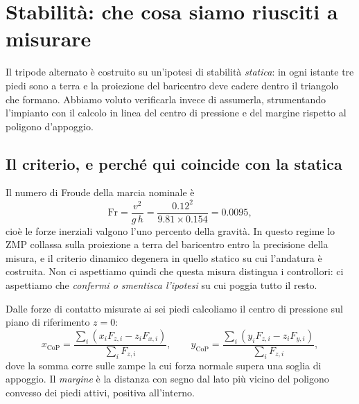 
\section{Stabilità: che cosa siamo riusciti a misurare}
\label{sec:zmp}

Il tripode alternato è costruito su un'ipotesi di stabilità \emph{statica}:
in ogni istante tre piedi sono a terra e la proiezione del baricentro deve
cadere dentro il triangolo che formano. Abbiamo voluto verificarla invece di
assumerla, strumentando l'impianto con il calcolo in linea del centro di
pressione e del margine rispetto al poligono d'appoggio.

\subsection{Il criterio, e perché qui coincide con la statica}

Il numero di Froude della marcia nominale è
\begin{equation}
\mathrm{Fr} = \frac{v^2}{g\,h} = \frac{0.12^2}{9.81 \times 0.154} = 0.0095 ,
\label{eq:froude}
\end{equation}
cioè le forze inerziali valgono l'uno percento della gravità. In questo
regime lo ZMP collassa sulla proiezione a terra del baricentro entro la
precisione della misura, e il criterio dinamico degenera in quello statico su
cui l'andatura è costruita. Non ci aspettiamo quindi che questa misura
distingua i controllori: ci aspettiamo che \emph{confermi o smentisca
l'ipotesi} su cui poggia tutto il resto.

Dalle forze di contatto misurate ai sei piedi calcoliamo il centro di
pressione sul piano di riferimento $z = 0$:
\begin{equation}
x_{\mathrm{CoP}} =
\frac{\sum_i \left( x_i F_{z,i} - z_i F_{x,i} \right)}{\sum_i F_{z,i}},
\qquad
y_{\mathrm{CoP}} =
\frac{\sum_i \left( y_i F_{z,i} - z_i F_{y,i} \right)}{\sum_i F_{z,i}},
\label{eq:cop}
\end{equation}
dove la somma corre sulle zampe la cui forza normale supera una soglia di
appoggio. Il \emph{margine} è la distanza con segno dal lato più vicino del
poligono convesso dei piedi attivi, positiva all'interno.

